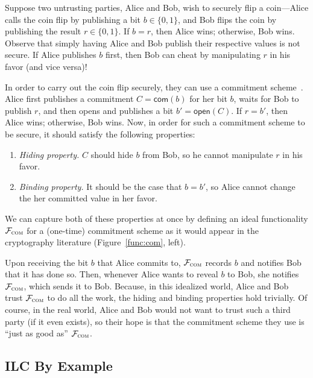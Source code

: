  Suppose two untrusting parties, Alice
and Bob, wish to securely flip a coin---Alice calls the coin flip by publishing a
bit $b \in \{ 0, 1\}$, and Bob flips the coin by publishing the result $r \in \{0,
1\}$. If $b = r$, then Alice wins; otherwise, Bob wins. Observe that simply
having Alice and Bob publish their respective values is not secure. If Alice
publishes $b$ first, then Bob can cheat by manipulating $r$ in his favor (and
vice versa)!

In order to carry out the coin flip securely, they can use a commitment
scheme~\cite{brassard1988minimum}. Alice first publishes a commitment $C =
\mathsf{com}(b)$ for her bit $b$, waits for Bob to publish $r$, and then opens
and publishes a bit $b' = \mathsf{open}(C)$. If $r = b'$, then Alice wins;
otherwise, Bob wins.  Now, in order for such a commitment scheme to be secure,
it should satisfy the following properties:
\begin{enumerate}[leftmargin=*]
  \item \emph{Hiding property.} $C$ should hide $b$ from Bob, so he cannot
    manipulate $r$ in his favor.
  \item \emph{Binding property.} It should be the case that $b=b'$, so Alice
    cannot change the her committed value in her favor.
\end{enumerate}

 We can capture both of these properties at
once by defining an ideal functionality $\mathcal{{F}}_{\textsc{com}}$ for a (one-time)
commitment scheme as it would appear in the cryptography literature
(Figure~\ref{func:com}, left).

Upon receiving the bit $b$ that Alice commits to, $\mathcal{{F}}_{\textsc{com}}$ records
$b$ and notifies Bob that it has done so. Then, whenever Alice wants to reveal
$b$ to Bob, she notifies $\mathcal{{F}}_{\textsc{com}}$, which sends it to Bob. Because,
in this idealized world, Alice and Bob trust $\mathcal{{F}}_{\textsc{com}}$ to do all
the work, the hiding and binding properties hold trivially. Of course, in the
real world, Alice and Bob would not want to trust such a third party (if it even
exists), so their hope is that the commitment scheme they use is ``just as good
as'' $\mathcal{{F}}_{\textsc{com}}$.\smallskip

\subsection{ILC By Example}
\label{subsec:ilc-flavored}

